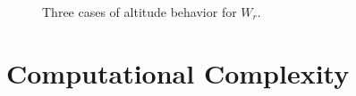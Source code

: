 \documentclass[../main.tex]{subfiles}
\begin{document}
\begin{figure}
	\centering
	\begin{subfigure}{0.45\linewidth}
		\centering
		
		\caption{\label{fig:altitude_case_pr_i}}
	\end{subfigure}%
	\quad
	\begin{subfigure}{0.45\linewidth}
		\centering
		
		\caption{\label{fig:altitude_case_pr_ii}}
	\end{subfigure}
	\begin{subfigure}{0.45\linewidth}
		\centering
		
		\caption{\label{fig:altitude_case_pr_iii}}
	\end{subfigure}
	\caption{Three cases of altitude behavior for $W_r$.}
	\label{fig:altitude_cases_pr}
\end{figure}


\section{Computational Complexity}
\label{section:single_agent_complexity}
\end{document}

